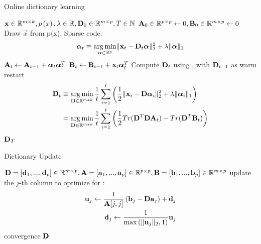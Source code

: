 \begin{algorithm}[h]
\caption{Online dictionary learning}
\label{alg:trainDL}
\begin{algorithmic}[1]
\REQUIRE $\boldsymbol{\mathrm{x}} \in \mathbb{R}^{m \times k},  p \left( x \right), \lambda \in
\mathbb{R}, \boldsymbol{\mathrm{D}}_0 \in \mathbb{R}^{m \times p}, T \in \mathbb{N}$
\STATE $\boldsymbol{\mathrm{A}}_0 \in \mathbb{R}^{p \times p} \gets  0, \boldsymbol{\mathrm{B}}_0 \in
\mathbb{R}^{m \times p}\gets 0$
\STATE Draw $\vec{x}$ from p(x).
\STATE Sparse code:
\begin{align*} 
\boldsymbol{\mathrm{\alpha}}_t \equiv \operatorname*{arg\,min}_{\boldsymbol{\mathrm{\alpha}}\in\mathbb{R}^{p}}  \lVert \boldsymbol{\mathrm{x}}_t
- \boldsymbol{\mathrm{D}}_t\boldsymbol{\mathrm{\alpha}} \rVert^{2}_{2}  +  \lambda \lVert \boldsymbol{\mathrm{\alpha}}
\rVert_{1}
\end{align*}
\STATE $\boldsymbol{\mathrm{A}}_t \gets \boldsymbol{\mathrm{A}}_{t-1} +
\boldsymbol{\mathrm{\alpha}}_t\boldsymbol{\mathrm{\alpha}}_t^T$\label{alg:Aupdate}
\STATE $\boldsymbol{\mathrm{B}}_t \gets \boldsymbol{\mathrm{B}}_{t-1} +
\boldsymbol{\mathrm{x}}_t\boldsymbol{\mathrm{\alpha}}_t^T$\label{alg:Bupdate}
\STATE Compute $\boldsymbol{\mathrm{D}}_t$ using , with $\boldsymbol{\mathrm{D}}_{t-1}$ as
warm restart 
\begin{equation}
\begin{split}
\boldsymbol{\mathrm{D}}_t  & \equiv \operatorname*{arg\,min}_{\boldsymbol{\mathrm{D}} \in \mathbb{R}^{m x k}}  \frac{1}{t}
\sum_{i=1}^t
\left( \frac{1}{2} \lVert \boldsymbol{\mathrm{x}}_i - \boldsymbol{\mathrm{D}}\boldsymbol{\mathrm{\alpha}}_i \rVert^{2}_{2}  + 
\lambda \lVert
\boldsymbol{\mathrm{\alpha}}_i \rVert_{1} \right) \\
& = \operatorname*{arg\,min}_{\boldsymbol{\mathrm{D}} \in \mathbb{R}^{m x k}}  \frac{1}{t} \sum_{i=1}^t
\left( \frac{1}{2} Tr(\boldsymbol{\mathrm{D}}^T\boldsymbol{\mathrm{D}}\boldsymbol{\mathrm{A}}_t) - Tr(\boldsymbol{\mathrm{D}}^T\boldsymbol{\mathrm{B}}_t)\right)
\label{eq:update}
\end{split}
\end{equation} 
\ENDFOR
\RETURN $\boldsymbol{\mathrm{D}}_T$
\end{algorithmic}
\end{algorithm}
\begin{algorithm}[h]
\caption{Dictionary Update}
\label{alg:update}
\begin{algorithmic}[1]
\REQUIRE $\boldsymbol{\mathrm{D}}=[\boldsymbol{\mathrm{d}}_1,...,\boldsymbol{\mathrm{d}}_p] \in \mathbb{R}^{m \times p},
\boldsymbol{\mathrm{A}}=[\boldsymbol{\mathrm{a}}_1,...,\boldsymbol{\mathrm{a}}_p] \in \mathbb{R}^{p \times p},
\boldsymbol{\mathrm{B}}=[\boldsymbol{\mathrm{b}}_1,...,\boldsymbol{\mathrm{b}}_p] \in \mathbb{R}^{m \times p}$
\REPEAT
{}
\STATE update the $j$-th column to optimize for :
\begin{align*}
\boldsymbol{\mathrm{u}}_j \gets
\frac{1}{\boldsymbol{\mathrm{A}}[j,j]}\left(\boldsymbol{\mathrm{b}}_j-\boldsymbol{\mathrm{D}}\boldsymbol{\mathrm{a}}_j\right)+\boldsymbol{\mathrm{d}}_j \\
\boldsymbol{\mathrm{d}}_j \gets \frac{1}{\max\left(\lVert \boldsymbol{\mathrm{u}}_j \rVert_2,1\right)} \boldsymbol{\mathrm{u}}_j
\end{align*}
\ENDFOR
\UNTIL convergence 
\RETURN $\boldsymbol{\mathrm{D}}$
\end{algorithmic}
\end{algorithm}

